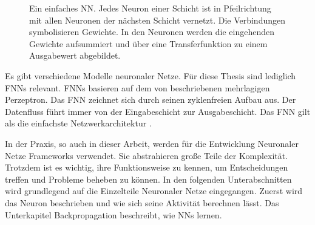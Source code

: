 \begin{figure}
  \centering
  \caption{Ein einfaches \acl{NN}. Jedes Neuron einer Schicht ist in Pfeilrichtung mit allen Neuronen der nächsten Schicht vernetzt. Die Verbindungen symbolisieren Gewichte. In den Neuronen werden die eingehenden Gewichte aufsummiert und über eine Transferfunktion zu einem Ausgabewert abgebildet.}
  \label{fig:beispiel-nn}
\end{figure}

Es gibt verschiedene Modelle neuronaler Netze. Für diese Thesis sind lediglich \aclp{FNN} relevant. \acp{FNN} basieren auf dem von \citeauthor{rosenblatt1958perceptron} \cite{rosenblatt1958perceptron} beschriebenen mehrlagigen Perzeptron. Das \ac{FNN} zeichnet sich durch seinen zyklenfreien Aufbau aus. Der Datenfluss führt immer von der Eingabeschicht zur Ausgabeschicht. Das \ac{FNN} gilt als die einfachste Netzwerkarchitektur \cite{Schmidhuber2015}.

In der Praxis, so auch in dieser Arbeit, werden für die Entwicklung Neuronaler Netze Frameworks verwendet. Sie abstrahieren große Teile der Komplexität. Trotzdem ist es wichtig, ihre Funktionsweise zu kennen, um Entscheidungen treffen und Probleme beheben zu können. In den folgenden Unterabschnitten wird grundlegend auf die Einzelteile Neuronaler Netze eingegangen. Zuerst wird das Neuron beschrieben und wie sich seine Aktivität berechnen lässt. Das Unterkapitel Backpropagation beschreibt, wie \acp{NN} lernen.

